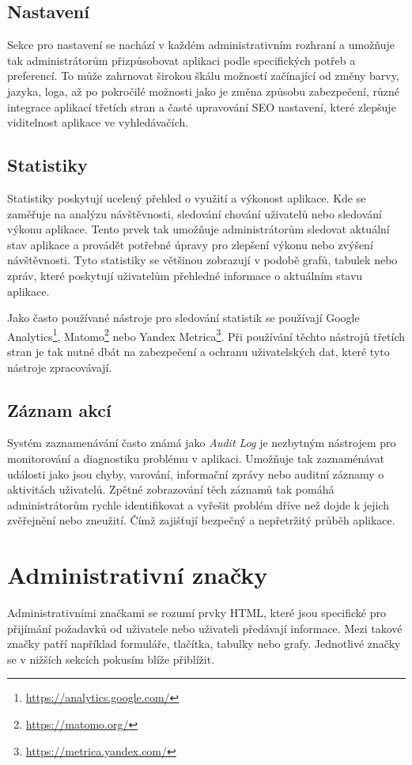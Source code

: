 \subsection{Nastavení}
\label{subsec:admin-elements-settings}
Sekce pro nastavení se nachází v každém administrativním rozhraní a umožňuje tak administrátorům přizpůsobovat aplikaci podle specifických potřeb a preferencí. To může zahrnovat širokou škálu možností začínající od změny barvy, jazyka, loga, až po pokročilé možnosti jako je změna způsobu zabezpečení, různé integrace aplikací třetích stran a časté upravování SEO nastavení, které zlepšuje viditelnost aplikace ve vyhledávačích.

\subsection{Statistiky}
\label{subsec:admin-elements-statistics}
Statistiky poskytují ucelený přehled o využití a výkonost aplikace. Kde se zaměřuje na analýzu návštěvnosti, sledování chování uživatelů nebo sledování výkonu aplikace. Tento prvek tak umožňuje administrátorům sledovat aktuální stav aplikace a provádět potřebné úpravy pro zlepšení výkonu nebo zvýšení návštěvnosti.
Tyto statistiky se většinou zobrazují v podobě grafů, tabulek nebo zpráv, které poskytují uživatelům přehledné informace o aktuálním stavu aplikace.

Jako často používané nástroje pro sledování statistik se používají Google Analytics\footnote[4]{\url{https://analytics.google.com/}}, Matomo\footnote[5]{\url{https://matomo.org/}} nebo Yandex Metrica\footnote[6]{\url{https://metrica.yandex.com/}}. Při používání těchto nástrojů třetích stran je tak nutné dbát na zabezpečení a ochranu uživatelských dat, které tyto nástroje zpracovávají.

\subsection{Záznam akcí}
\label{subsec:admin-elements-logs}
Systém zaznamenávání často známá jako \textit{Audit Log} je nezbytným nástrojem pro monitorování a diagnostiku problému v aplikaci. Umožňuje tak zaznaménávat události jako jsou chyby, varování, informační zprávy nebo auditní záznamy o aktivitách uživatelů. Zpětné zobrazování těch záznamů tak pomáhá administrátorům rychle identifikovat a vyřešit problém dříve než dojde k jejich zvěřejnění nebo zneužití. Čímž zajišťují bezpečný a nepřetržitý průběh aplikace.

\section{Administrativní značky}
\label{sec:admin-tags}
Administrativními značkami se rozumí prvky HTML, které jsou specifické pro přijímání požadavků od uživatele nebo uživateli předávají informace. Mezi takové značky patří například formuláře, tlačítka, tabulky nebo grafy. Jednotlivé značky se v nižších sekcích pokusím blíže přiblížit.

